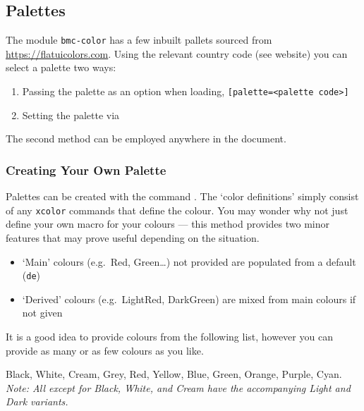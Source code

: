\documentclass[solid,math,chem,code,plot,gloss]{bmc}
\begin{document}
\subsection{Palettes}
\label{subsec:palettes}
The module \texttt{bmc-color} has a few inbuilt pallets
sourced from \url{https://flatuicolors.com}.
Using the relevant country code (see website) you can select a palette two ways:
\begin{enumerate}
    \item Passing the palette as an option when loading, \texttt{[palette=<palette code>]}
    \item Setting the palette via \texttt{}
\end{enumerate}
The second method can be employed anywhere in the document.

\subsubsection{Creating Your Own Palette}

Palettes can be created with the command \texttt{}.
The `color definitions' simply consist of any \texttt{xcolor} commands that define the colour.
You may wonder why not just define your own macro for your colours ---
this method provides two minor features that may prove useful depending on the situation.
\begin{itemize}
    \item `Main' colours (e.g.\ Red, Green\dots) not provided are populated from a default (\texttt{de})
    \item `Derived' colours (e.g.\ LightRed, DarkGreen) are mixed from main colours if not given
\end{itemize}
It is a good idea to provide colours from the following list, however you can provide as many or as few
colours as you like.

\begin{center}
    \selectfont
    \textcolor{Black!50!text}{Black},
    \textcolor{White!50!text}{White},
    \textcolor{Cream!50!text}{Cream},
    \textcolor{Grey!50!text}{Grey},
    \textcolor{Red!50!text}{Red},
    \textcolor{Yellow!50!text}{Yellow},
    \textcolor{Blue!50!text}{Blue},
    \textcolor{Green!50!text}{Green},
    \textcolor{Orange!50!text}{Orange},
    \textcolor{Purple!50!text}{Purple},
    \textcolor{Cyan!50!text}{Cyan}.
    \\[0.5ex]
    \selectfont
    \upshape\scriptsize\slshape
    Note: All except for Black, White, and Cream have the
    accompanying Light and Dark variants.
\end{center}
\end{document}

